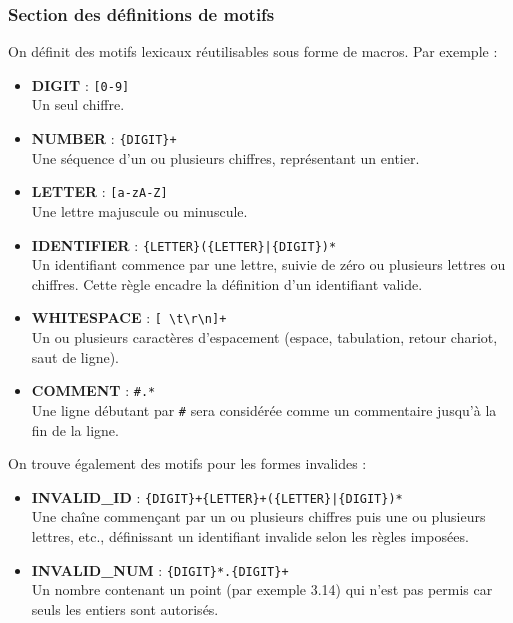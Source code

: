 \documentclass[12pt,a4paper]{article}
\begin{document}
\subsubsection{Section des définitions de motifs}

On définit des motifs lexicaux réutilisables sous forme de macros. Par exemple :

\begin{itemize}
    \item \textbf{DIGIT} : \texttt{[0-9]} \\
    Un seul chiffre.
    
    \item \textbf{NUMBER} : \texttt{\{DIGIT\}+} \\
    Une séquence d’un ou plusieurs chiffres, représentant un entier.
    
    \item \textbf{LETTER} : \texttt{[a-zA-Z]} \\
    Une lettre majuscule ou minuscule.
    
    \item \textbf{IDENTIFIER} : \texttt{\{LETTER\}(\{LETTER\}|\{DIGIT\})*} \\
    Un identifiant commence par une lettre, suivie de zéro ou plusieurs lettres ou chiffres. Cette règle encadre la définition d’un identifiant valide.
    
    \item \textbf{WHITESPACE} : \texttt{[ \textbackslash t\textbackslash r\textbackslash n]+} \\
    Un ou plusieurs caractères d’espacement (espace, tabulation, retour chariot, saut de ligne).
    
    \item \textbf{COMMENT} : \texttt{\#.*} \\
    Une ligne débutant par \texttt{\#} sera considérée comme un commentaire jusqu’à la fin de la ligne.
\end{itemize}

On trouve également des motifs pour les formes invalides :

\begin{itemize}
    \item \textbf{INVALID\_ID} : \texttt{\{DIGIT\}+\{LETTER\}+(\{LETTER\}|\{DIGIT\})*} \\
    Une chaîne commençant par un ou plusieurs chiffres puis une ou plusieurs lettres, etc., définissant un identifiant invalide selon les règles imposées.
    
    \item \textbf{INVALID\_NUM} : \texttt{\{DIGIT\}*.\{DIGIT\}+} \\
    Un nombre contenant un point (par exemple 3.14) qui n’est pas permis car seuls les entiers sont autorisés.
\end{itemize}
\end{document}
